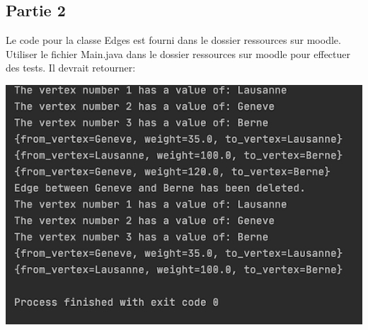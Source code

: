 \subsection{Partie 2}
Le code pour la classe Edges est fourni dans le dossier ressources sur moodle.
Utiliser le fichier Main.java dans le dossier ressources sur moodle pour effectuer des tests. Il devrait retourner:

\includegraphics[]{ressources/sortie_juste.PNG}

